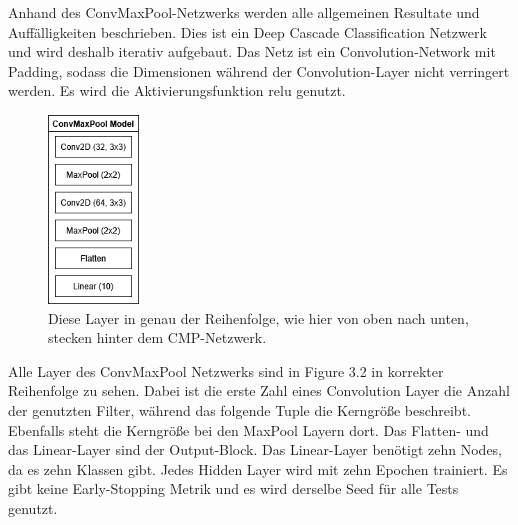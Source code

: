 Anhand des ConvMaxPool-Netzwerks werden alle allgemeinen Resultate und Auffälligkeiten beschrieben. 
Dies ist ein Deep Cascade Classification Netzwerk und wird deshalb iterativ aufgebaut. 
Das Netz ist ein Convolution-Network mit Padding, sodass die Dimensionen während der Convolution-Layer nicht verringert werden. 
Es wird die Aktivierungsfunktion relu genutzt. 

\begin{figure}[htpb]
    \centering
    \includegraphics[height=5cm]{../../Graphiken/convmaxpool.png}
    \caption{\label{fig:convmaxpool} 
    \small{Diese Layer in genau der Reihenfolge, wie hier von oben nach unten, stecken hinter dem CMP-Netzwerk.}}
\end{figure}

Alle Layer des ConvMaxPool Netzwerks sind in Figure 3.2 in korrekter Reihenfolge zu sehen. Dabei ist die erste Zahl eines Convolution Layer 
die Anzahl der genutzten Filter, während das folgende Tuple die Kerngröße beschreibt. Ebenfalls steht die Kerngröße bei den MaxPool Layern dort. 
Das Flatten- und das Linear-Layer sind der Output-Block. Das Linear-Layer benötigt zehn Nodes, da es zehn Klassen gibt. Jedes Hidden Layer wird 
mit zehn Epochen trainiert. Es gibt keine Early-Stopping Metrik und es wird derselbe Seed für alle Tests genutzt. 
